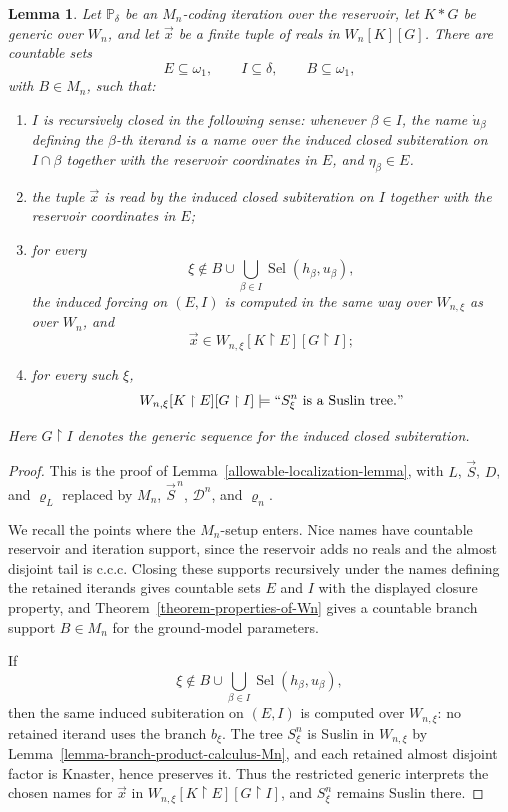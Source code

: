 \documentclass[a4paper,11pt]{article}
\newtheorem{lemma}[theorem]{Lemma}
\newcommand{\forceP}{\mathbb{P}}
\begin{document}
\begin{lemma}
\label{lemma-localization-branch-omission-Mn}
Let $\forceP_\delta$ be an $M_n$-coding iteration over the reservoir, let
$K*G$ be generic over $W_n$, and let $\vec x$ be a finite tuple of reals in
$W_n[K][G]$.  There are countable sets
\[
   E\subseteq\omega_1,
   \qquad
   I\subseteq\delta,
   \qquad
   B\subseteq\omega_1,
\]
with $B\in M_n$, such that:
\begin{enumerate}
   \item $I$ is recursively closed in the following sense: whenever
         $\beta\in I$, the name $\dot u_\beta$ defining the
         $\beta$-th iterand is a name over the induced closed subiteration
         on $I\cap\beta$ together with the reservoir coordinates in $E$,
         and $\eta_\beta\in E$.

   \item the tuple $\vec x$ is read by the induced closed subiteration on
         $I$ together with the reservoir coordinates in $E$;

   \item for every
         \[
            \xi\notin
            B\cup\bigcup_{\beta\in I}
               \operatorname{Sel}(h_\beta,u_\beta),
         \]
         the induced forcing on $(E,I)$ is computed in the same way over
         $W_{n,\xi}$ as over $W_n$, and
         \[
            \vec x\in
            W_{n,\xi}[K\restriction E][G\restriction I];
         \]

   \item for every such $\xi$,
         \[
            W_{n,\xi}[K\restriction E][G\restriction I]
            \models
            ``S^n_\xi\text{ is a Suslin tree}."
         \]
\end{enumerate}
Here $G\restriction I$ denotes the generic sequence for the induced closed
subiteration.
\end{lemma}
\begin{proof}
This is the proof of Lemma~\ref{allowable-localization-lemma}, with $L$,
$\vec S$, $D$, and $\varrho_L$ replaced by $M_n$, $\vec S^{\,n}$,
$\mathcal D^n$, and $\varrho_n$.

We recall the points where the $M_n$-setup enters.  Nice names have countable
reservoir and iteration support, since the reservoir adds no reals and the
almost disjoint tail is c.c.c.  Closing these supports recursively under the
names defining the retained iterands gives countable sets $E$ and $I$ with
the displayed closure property, and Theorem~\ref{theorem-properties-of-Wn}
gives a countable branch support $B\in M_n$ for the ground-model parameters.

If
\[
   \xi\notin B\cup\bigcup_{\beta\in I}\operatorname{Sel}(h_\beta,u_\beta),
\]
then the same induced subiteration on $(E,I)$ is computed over
$W_{n,\xi}$: no retained iterand uses the branch $b_\xi$.  The tree
$S^n_\xi$ is Suslin in $W_{n,\xi}$ by
Lemma~\ref{lemma-branch-product-calculus-Mn}, and each retained almost
disjoint factor is Knaster, hence preserves it.  Thus the restricted generic
interprets the chosen names for $\vec x$ in
$W_{n,\xi}[K\restriction E][G\restriction I]$, and $S^n_\xi$ remains Suslin
there.
\end{proof}
\end{document}

